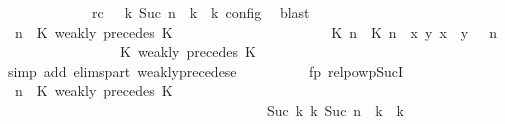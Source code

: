 \begin{isabellebody}
\ \ \ \ \ \ \ \ \ \ \ \ \ rc{\isacharcolon}{\isacartoucheopen}{\isasymrho}\ {\isasymin}\ {\isasymlbrakk}\ {\isasymGamma}\isactrlsub k{\isacharcomma}\ Suc\ n\ {\isasymturnstile}\ {\isasymPsi}\isactrlsub k\ {\isasymtriangleright}\ {\isasymPhi}\isactrlsub k\ {\isasymrbrakk}\isactrlsub c\isactrlsub o\isactrlsub n\isactrlsub f\isactrlsub i\isactrlsub g{\isacartoucheclose}\ \isamarkupfalse%
\ blast\isanewline
\ \ \ \ \ \ \ \ \isamarkupfalse%
\ {\isacartoucheopen}{\isacharparenleft}{\isasymGamma}{\isacharcomma}\ n\ {\isasymturnstile}\ {\isacharparenleft}{\isacharparenleft}K\ weakly\ precedes\ K\ {\isacharhash}\ {\isasymPsi}{\isacharparenright}\ {\isasymtriangleright}\ {\isasymPhi}{\isacharparenright}\isanewline
\ \ \ \ \ \ \ \ \ \ \ \ \ \ \ \ {\isasymhookrightarrow}\ {\isacharparenleft}{\isacharparenleft}{\isacharparenleft}{\isasymlceil}{\isacharhash}\isactrlsup {\isasymle}\ K\ n{\isacharcomma}\ {\isacharhash}\isactrlsup {\isasymle}\ K\ n{\isasymrceil}\ {\isasymin}\ {\isacharparenleft}{\isasymlambda}{\isacharparenleft}x{\isacharcomma}\ y{\isacharparenright}{\isachardot}\ x\ {\isasymle}\ y{\isacharparenright}{\isacharparenright}\ {\isacharhash}\ {\isasymGamma}{\isacharparenright}{\isacharcomma}\ n\isanewline
\ \ \ \ \ \ \ \ \ \ \ \ \ \ {\isasymturnstile}\ {\isasymPsi}\ {\isasymtriangleright}\ {\isacharparenleft}{\isacharparenleft}K\ weakly\ precedes\ K\ {\isacharhash}\ {\isasymPhi}{\isacharparenright}{\isacharparenright}{\isacartoucheclose}\isanewline
\ \ \ \ \ \ \ \ \ \ \isamarkupfalse%
\ {\isacharparenleft}simp\ add{\isacharcolon}\ elims{\isacharunderscore}part\ weakly{\isacharunderscore}precedes{\isacharunderscore}e{\isacharparenright}\isanewline
\ \ \ \ \ \ \ \ \isamarkupfalse%
\ fp\ relpowp{\isacharunderscore}Suc{\isacharunderscore}I{}\ \isamarkupfalse%
\ {\isacartoucheopen}{\isacharparenleft}{\isasymGamma}{\isacharcomma}\ n\ {\isasymturnstile}\ {\isacharparenleft}{\isacharparenleft}K\ weakly\ precedes\ K\ {\isacharhash}\ {\isasymPsi}{\isacharparenright}\ {\isasymtriangleright}\ {\isasymPhi}{\isacharparenright}\isanewline
\ \ \ \ \ \ \ \ \ \ \ \ \ \ \ \ \ \ \ \ \ \ \ \ \ \ \ \ \ \ \ \ \ \ \ \ \ \ {\isasymhookrightarrow}\isactrlbsup Suc\ k\isactrlesup \ {\isacharparenleft}{\isasymGamma}\isactrlsub k{\isacharcomma}\ Suc\ n\ {\isasymturnstile}\ {\isasymPsi}\isactrlsub k\ {\isasymtriangleright}\ {\isasymPhi}\isactrlsub k{\isacharparenright}{\isacartoucheclose}\isanewline

\end{isabellebody}
